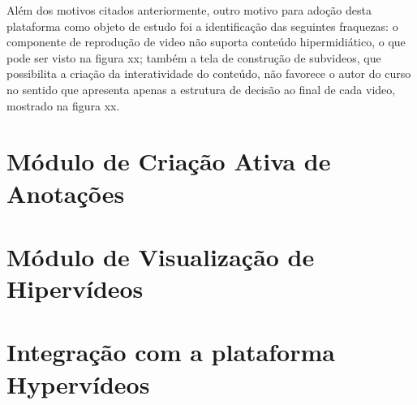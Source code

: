 Além dos motivos citados anteriormente, outro motivo para adoção desta plataforma como objeto de estudo foi a identificação das seguintes fraquezas: o componente de reprodução de video não suporta conteúdo hipermidiático, o que pode ser visto na figura xx; também a tela de construção de subvideos, que possibilita a criação da interatividade do conteúdo, não favorece o autor do curso no sentido que apresenta apenas a estrutura de decisão ao final de cada video, mostrado na figura xx.


\section{Módulo de Criação Ativa de Anotações}

\section{Módulo de Visualização de Hipervídeos}

\section{Integração com a plataforma Hypervídeos}
